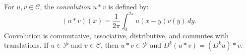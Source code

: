 For $u, v \in \mathcal{C}$, the \textit{convolution} $u * v$ is defined by:
\[
(u * v)(x) = \frac{1}{2\pi} \int_0^{2\pi} u(x - y)v(y)\,dy.
\]
Convolution is commutative, associative, distributive, and commutes with translations. If $u \in \mathcal{P}$ and $v \in \mathcal{C}$, then $u * v \in \mathcal{P}$ and $D^k(u * v) = (D^k u) * v$.
